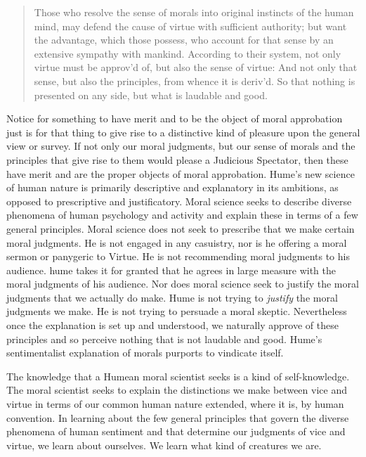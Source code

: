 \begin{quote}
	Those who resolve the sense of morals into original instincts of the human mind, may defend the cause of virtue with sufficient authority; but want the advantage, which those possess, who account for that sense by an extensive sympathy with mankind. According to their system, not only virtue must be approv'd of, but also the sense of virtue: And not only that sense, but also the principles, from whence it is deriv'd. So that nothing is presented on any side, but what is laudable and good.
\end{quote}

Notice for something to have merit and to be the object of moral approbation just is for that thing to give rise to a distinctive kind of pleasure upon the general view or survey. If not only our moral judgments, but our sense of morals and the principles that give rise to them would please a Judicious Spectator, then these have merit and are the proper objects of moral approbation. Hume's new science of human nature is primarily descriptive and explanatory in its ambitions, as opposed to prescriptive and justificatory. Moral science seeks to describe diverse phenomena of human psychology and activity and explain these in terms of a few general principles. Moral science does not seek to prescribe that we make certain moral judgments. He is not engaged in any casuistry, nor is he offering a moral sermon or panygeric to Virtue. He is not recommending moral judgments to his audience. hume takes it for granted that he agrees in large measure with the moral judgments of his audience. Nor does moral science seek to justify the moral judgments that we actually do make. Hume is not trying to \emph{justify} the moral judgments we make. He is not trying to persuade a moral skeptic. Nevertheless once the explanation is set up and understood, we naturally approve of these principles and so perceive nothing that is not laudable and good. Hume's sentimentalist explanation of morals purports to vindicate itself.

The knowledge that a Humean moral scientist seeks is a kind of self-knowledge. The moral scientist seeks to explain the distinctions we make between vice and virtue in terms of our common human nature extended, where it is, by human convention. In learning about the few general principles that govern the diverse phenomena of human sentiment and that determine our judgments of vice and virtue, we learn about ourselves. We learn what kind of creatures we are.

